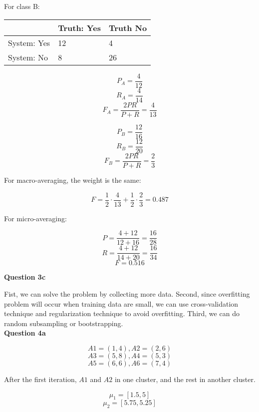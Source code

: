 \documentclass[11pt,a4paper]{report}
\begin{document}
\begin{multicols*}{2}
\noindent For class B:
\begin{center}
\begin{tabular}{| l | l | l |}
\hline
             & Truth: Yes & Truth No \\ \hline
System: Yes  & 12 & 4  \\ \hline
System: No   & 8  & 26 \\ \hline
\end{tabular}
\end{center}

$$P_A = \frac{4}{12}$$
$$R_A = \frac{4}{14}$$
$$F_A = \frac{2PR}{P+R} = \frac{4}{13}$$

$$P_B = \frac{12}{16}$$
$$R_B = \frac{12}{20}$$
$$F_B = \frac{2PR}{P+R} = \frac{2}{3}$$

\noindent For macro-averaging, the weight is the same:

$$F = \frac{1}{2} \cdot \frac{4}{13} + \frac{1}{2} \cdot \frac{2}{3} = 0.487$$

\noindent For micro-averaging:

$$P = \frac{4 + 12}{12 + 16} = \frac{16}{28}$$
$$R = \frac{4 + 12}{14 + 20} = \frac{16}{34}$$
$$F = 0.516$$

\noindent \textbf{Question 3c}

\noindent Fist, we can solve the problem by collecting more data. Second, since overfitting problem will occur when training data are small, we can use cross-validation technique and regularization technique to avoid overfitting. Third, we can do random subsampling or bootstrapping. \\

\noindent \textbf{Question 4a}

$$A1=(1,4), A2=(2,6)$$
$$A3=(5,8), A4=(5,3)$$
$$A5=(6,6), A6=(7,4)$$


\noindent After the first iteration, $A1$ and $A2$ in one cluster, and the rest in another cluster.

$$\mu_1 = [1.5,5]$$
$$\mu_2 = [5.75, 5.25]$$



\end{multicols*}
\end{document}
